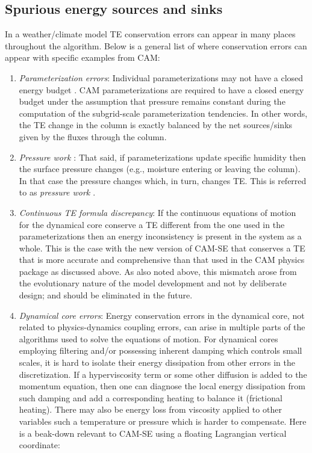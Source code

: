 \documentclass[draft,linenumbers]{agujournal}
\begin{document}
\subsection{Spurious energy sources and sinks}\label{subsec:spuriousE}
In a weather/climate model TE conservation errors can appear in many places throughout the algorithm. Below is a general list of where conservation errors can appear with specific examples from CAM:
\begin{enumerate}
\item {\em{Parameterization errors}}: Individual parameterizations may not have a closed energy budget {\color{red}{; for example, they may not have been designed to conserve TE or they may conserve a different TE}}. CAM parameterizations are required to have a closed energy budget under the assumption that pressure remains constant during the computation of the subgrid-scale parameterization tendencies. In other words, the TE change in the column is exactly balanced by the net sources/sinks given by the fluxes through the column. 
\item {\em{Pressure work {\color{red}{error}}}}: That said, if parameterizations update specific humidity then the surface pressure changes (e.g., moisture entering or leaving the column). In that case the pressure changes which, in turn, changes TE. This is referred to as {\em{pressure work {\color{red}{error}}}} \citep[section 3.1.8 in ][]{CAM5}.
\item {\em{Continuous TE formula discrepancy}}:  If the continuous equations of motion for the dynamical core conserve a TE different from the one used in the parameterizations then an energy inconsistency is present in the system as a whole. This is the case with the new version of CAM-SE that conserves a TE that is more accurate and comprehensive than that used in the CAM physics package as discussed above. As also noted above, this mismatch arose from the evolutionary nature of the model development and not by deliberate design; and should be eliminated in the future.
\item {\em{Dynamical core errors}}: Energy conservation errors in the dynamical core, not related to physics-dynamics coupling errors, can arise in multiple parts of the algorithms used to solve the equations of motion. For dynamical cores employing filtering \citep[e.g., limiters in flux operators ][]{L2004MWR} and/or possessing inherent damping which controls small scales, it is hard to isolate their energy dissipation from other errors in the discretization. If a hyperviscosity term or some other diffusion is added to the momentum equation, then one can diagnose the local energy dissipation from such damping and add a corresponding heating to balance it (frictional heating). There may also be energy loss from viscosity applied to other variables such a temperature or pressure which is harder to compensate. Here is a beak-down relevant to CAM-SE using a floating Lagrangian vertical coordinate:

\end{enumerate}
\end{document}
